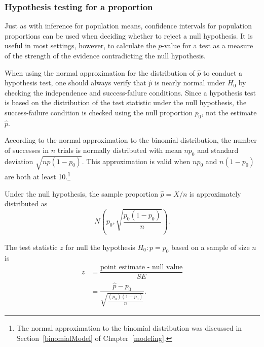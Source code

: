 \subsubsection{Hypothesis testing for a proportion}
\label{htForPropSection}

Just as with inference for population means, confidence intervals for population proportions can be used when deciding whether to reject a null hypothesis. It is useful in most settings, however, to calculate the $p$-value for a test as a measure of the strength of the evidence contradicting the null hypothesis.

When using the normal approximation for the distribution of $\hat{p}$ to conduct a hypothesis test, one should always verify that $\hat{p}$ is nearly normal under $H_0$ by checking the independence and success-failure conditions. Since a hypothesis test is based on the distribution of the test statistic under the null hypothesis, the success-failure condition is checked using the null proportion $p_0$, not the estimate $\hat{p}$. 

According to the normal approximation to the binomial distribution, the number of successes in $n$ trials is normally distributed with mean $np_0$ and standard deviation $\sqrt{np(1-p_0)}$. This approximation is valid when $np_0$ and $n(1-p_0)$ are both at least 10.\footnote{The normal approximation to the binomial distribution was discussed in Section~\ref{binomialModel} of Chapter~\ref{modeling}.} 

Under the null hypothesis, the sample proportion $\hat{p} = X/n$ is approximately distributed as 
\[N \left(p_0, \sqrt{\frac{p_0(1-p_0)}{n}} \right).\]

The test statistic $z$ for null the hypothesis $H_0: p = p_0$ based on a sample of size $n$ is 
\begin{align*}
  z &= \dfrac{\text{point estimate - null value}}{SE} \\
    &= \dfrac{\hat{p} - p_0}{\sqrt{\frac{(p_0)(1-p_0)}{n}}}. 
\end{align*}

